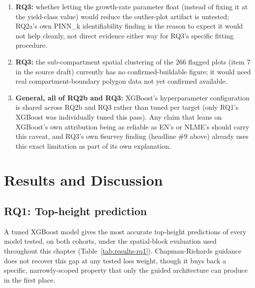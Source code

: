 \documentclass[11pt,a4paper]{report}
\begin{document}
\begin{enumerate}
  density was run to confirm it directly.
\item \textbf{RQ3:} whether letting the growth-rate parameter float (instead of fixing
  it at the yield-class value) would reduce the outlier-plot artifact is untested;
  RQ2a's own PINN\_k identifiability finding is the reason to expect it would not help
  cleanly, not direct evidence either way for RQ3's specific fitting procedure.
\item \textbf{RQ3:} the sub-compartment spatial clustering of the 266 flagged plots
  (item 7 in the source draft) currently has no confirmed-buildable figure; it would
  need real compartment-boundary polygon data not yet confirmed available.
\item \textbf{General, all of RQ2b and RQ3:} XGBoost's hyperparameter configuration is
  shared across RQ2b and RQ3 rather than tuned per target (only RQ1's XGBoost was
  individually tuned this pass). Any claim that leans on XGBoost's own attribution
  being as reliable as EN's or NLME's should carry this caveat, and RQ3's own 6survey
  finding (headline \#9 above) already uses this exact limitation as part of its own
  explanation.
\end{enumerate}


\chapter{Results and Discussion}
\label{ch:results}

\section{RQ1: Top-height prediction}
\label{sec:results-rq1}

A tuned XGBoost model gives the most accurate top-height predictions of every model
tested, on both cohorts, under the spatial-block evaluation used throughout this
chapter (Table~\ref{tab:results-rq1}). Chapman-Richards guidance does not recover this
gap at any tested loss weight, though it buys back a specific, narrowly-scoped
property that only the guided architecture can produce in the first place.
\end{document}
